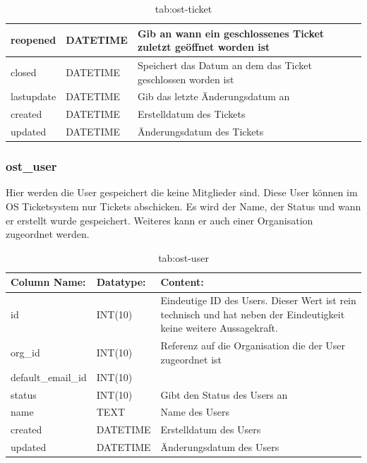 \begin{table}[h]
\begin{tabular}{|p{3cm}|p{4cm}|p{7.7cm}|}
		\hline
		reopened & DATETIME & Gib an wann ein geschlossenes Ticket zuletzt geöffnet worden ist \\
		\hline
		closed & DATETIME & Speichert das Datum an dem das Ticket geschlossen worden ist \\
		\hline
		lastupdate & DATETIME & Gib das letzte Änderungsdatum an \\
		\hline
		created & DATETIME & Erstelldatum des Tickets\\
		\hline
		updated & DATETIME & Änderungsdatum des Tickets\\
		\hline
	\end{tabular}
	\caption{tab:ost-ticket}
\end{table}
\label{tab:ost_ticket}
\newpage

\subsubsection{ost\_user}

Hier werden die User gespeichert die keine Mitglieder sind. Diese User können im OS Ticketsystem nur Tickets abschicken. Es wird der Name, der Status und wann er erstellt wurde gespeichert. Weiteres kann er auch einer Organisation zugeordnet werden.

\begin{table}[h]
	\begin{tabular}{|p{3cm}|p{4cm}|p{7.7cm}|}
		\hline
		\textbf{Column Name:} & \textbf{Datatype:} & \textbf{Content:}\\
		\hline
		id & INT(10) & Eindeutige ID des Users. Dieser Wert ist rein technisch und hat  neben der Eindeutigkeit keine weitere 
		Aussagekraft.\\
		\hline
		org\_id & INT(10) & Referenz auf die Organisation die der User zugeordnet ist\\
		\hline
		default\_email\_id& INT(10) & \\
		\hline
		status & INT(10) & Gibt den Status des Users an\\
		\hline
		name & TEXT & Name des Users\\
		\hline
		created & DATETIME & Erstelldatum des Users\\
		\hline
		updated & DATETIME & Änderungsdatum des Users\\
		\hline
		
	\end{tabular}
	\caption{tab:ost-user}
\end{table}
\label{tab:ost_user}

